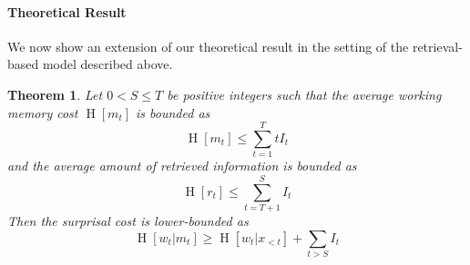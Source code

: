 \documentclass[11pt,letterpaper]{article}
\newcounter{theorem}
\newtheorem{thm}[theorem]{Theorem}
\begin{document}

\paragraph{Theoretical Result}
We now show an extension of our theoretical result in the setting of the retrieval-based model described above.

\begin{thm}
Let $0 < S \leq T$ be positive integers such that the average working memory cost $\operatorname{H}[m_t]$ is bounded as
	\begin{equation}
		\operatorname{H}[m_t] \leq \sum_{t=1}^T t I_t
	\end{equation}
	and the average amount of retrieved information is bounded as
	\begin{equation}
		\operatorname{H}[r_t] \leq \sum_{t=T+1}^S I_t
	\end{equation} %
	Then the surprisal cost is lower-bounded as
	\begin{equation}
		\operatorname{H}[w_t|m_t] \geq \operatorname{H}[w_t|x_{<t}] + \sum_{t>S} I_t
	\end{equation}
\end{thm}
\end{document}
